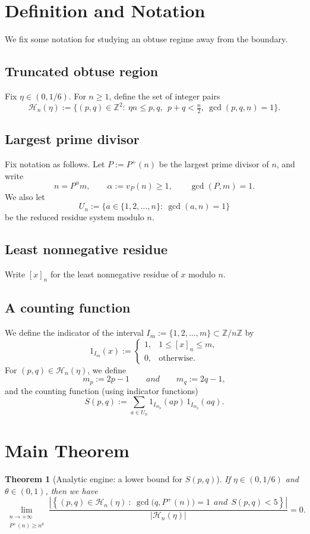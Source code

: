 \documentclass[12pt]{amsart}
\newtheorem{theorem}{Theorem}[section]
\newcommand{\Z}{\mathbb{Z}}
\begin{document}
\section{Definition and Notation}
We fix some notation for studying an obtuse regime away from the boundary.

\subsection*{Truncated obtuse region}
Fix $\eta\in(0,1/6)$. For $n\ge 1$, define the set of integer pairs
\begin{equation}\label{eq:Hn}
\mathcal H_n(\eta):=\{(p,q)\in\mathbb Z^2:\ \eta n\le p,q,\ \ p+q<\tfrac{n}{2},\ \gcd(p,q,n)=1\}.
\end{equation}

\subsection*{Largest prime divisor}
Fix notation as follows. Let $P:=P^+(n)$ be the largest prime divisor of $n$, and write
\[
n=P^{\alpha}m,\qquad \alpha:=v_P(n)\ge 1,\qquad \gcd(P,m)=1.
\]
We also let
\begin{equation}
U_n:=\{a\in\{1,2,\dots,n\}:\ \gcd(a,n)=1\}
\end{equation}
be the reduced residue system modulo $n$.

\subsection*{Least nonnegative residue}
Write $[x]_n$ for the least nonnegative residue of $x$ modulo $n$.

\subsection*{A counting function}
We define the indicator of the interval $I_m:=\{1,2,\dots,m\}\subset\Z/n\Z$ by
\[
1_{I_m}(x):=
\begin{cases}
1,& 1\le [x]_n\le m,\\
0,& \text{otherwise.}
\end{cases}
\]
For $(p,q)\in\mathcal{H}_n(\eta)$, we define
\[
m_p:=2p-1\qquad and \qquad m_q:=2q-1,
\]
and the counting function (using indicator functions)
\begin{equation}
\label{eq:Sdef}
S(p,q):=\sum_{a\in U_n} 1_{I_{m_p}}(ap)\,1_{I_{m_q}}(aq).
\end{equation}

\section{Main Theorem}


\begin{theorem}[Analytic engine: a lower bound for $S(p,q)$]\label{thm:engine}
If $\eta\in(0,1/6)$ and $\theta\in(0,1)$, then we have
$$
\lim_{\substack{n\rightarrow +\infty\\
P^+(n)\geq n^{\theta}}} \frac{|\left \{ (p,q) \in \mathcal{H}_n(\eta) \ : \ \gcd\!\big(q,P^+(n)\big)=1  \ \ and \ \ S(p,q)<5\right\}|}{|\mathcal{H}_n(\eta)|}=0.
$$
\end{theorem}
\end{document}
